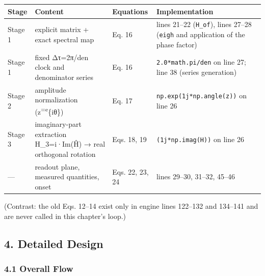 \documentclass[
  a4paper,
]{ltjsarticle}
\newcounter{none} %
\begin{document}
{\def\LTcaptype{none} %
\begin{longtable}[]{@{}
  >{\raggedright\arraybackslash}p{}
  >{\raggedright\arraybackslash}p{}
  >{\raggedright\arraybackslash}p{}
  >{\raggedright\arraybackslash}p{}@{}}
\toprule\noalign{}
\begin{minipage}[b]{\linewidth}\raggedright
Stage
\end{minipage} & \begin{minipage}[b]{\linewidth}\raggedright
Content
\end{minipage} & \begin{minipage}[b]{\linewidth}\raggedright
Equations
\end{minipage} & \begin{minipage}[b]{\linewidth}\raggedright
Implementation
\end{minipage} \\
\midrule\noalign{}
\endhead
\bottomrule\noalign{}
\endlastfoot
Stage 1 & explicit matrix + exact spectral map & Eq. 16 & lines 21--22
(\texttt{H\_of}), lines 27--28 (\texttt{eigh} and application of the
phase factor) \\
Stage 1 & fixed Δτ=2π/den clock and denominator series & Eq. 16 &
\texttt{2.0*math.pi/den} on line 27; line 38 (series generation) \\
Stage 2 & amplitude normalization (z\textsuperscript{=e}\{iθ\}) & Eq. 17
& \texttt{np.exp(1j*np.angle(z))} on line 26 \\
Stage 3 & imaginary-part extraction H\_3=i·Im(Ĥ) → real orthogonal
rotation & Eqs. 18, 19 & \texttt{(1j*np.imag(H))} on line 26 \\
--- & readout plane, measured quantities, onset & Eqs. 22, 23, 24 &
lines 29--30, 31--32, 45--46 \\
\end{longtable}
}

(Contrast: the old Eqs. 12--14 exist only in engine lines 122--132 and
134--141 and are never called in this chapter's loop.)

\subsection{4. Detailed Design}\label{detailed-design}

\subsubsection{4.1 Overall Flow}\label{overall-flow}
\end{document}

